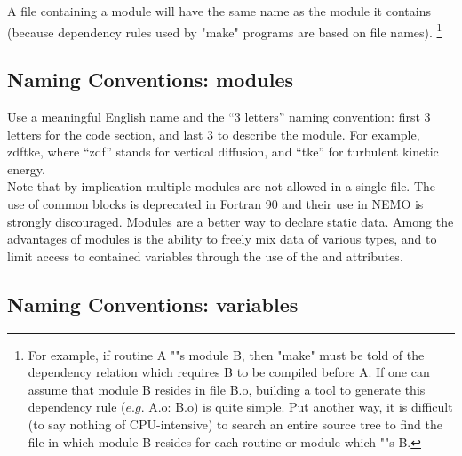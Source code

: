 \documentclass{article}
\begin{document}
A file containing a module will have the same name as the module it contains
(because dependency rules used by "make" programs are based on file names).
\footnote{
  For example, if routine A ""s module B, then "make" must be told of the dependency relation which
  requires B to be compiled before A.
  If one can assume that module B resides in file B.o,
  building a tool to generate this dependency rule ($e.g.$ A.o: B.o) is quite simple.
  Put another way, it is difficult (to say nothing of CPU-intensive) to search an entire source tree to
  find the file in which module B resides for each routine or module which ""s B.
}

\subsection{Naming Conventions: modules}

Use a meaningful English name and the ``3 letters'' naming convention:
first 3 letters for the code section, and last 3 to describe the module.
For example, zdftke, where ``zdf'' stands for vertical diffusion, and ``tke'' for turbulent kinetic energy. \\
Note that by implication multiple modules are not allowed in a single file.
The use of common blocks is deprecated in Fortran 90 and their use in NEMO is strongly discouraged.
Modules are a better way to declare static data.
Among the advantages of modules is the ability to freely mix data of various types, and
to limit access to contained variables through the use of the  and  attributes.

\subsection{Naming Conventions: variables}
\end{document}
